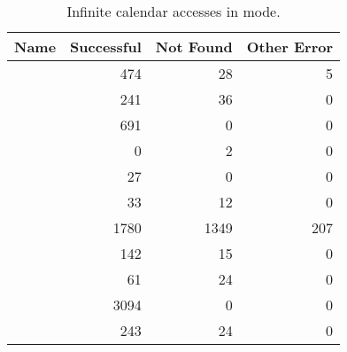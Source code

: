 \begin{centering}
  \begin{table}[htb]
    \centering
    {\scriptsize
      \begin{tabular}{|l|r|r|r|}
        \hline
        Name & Successful & Not Found & Other Error \\
        \hline
        \acunetix{} & 474 & 28 & 5 \\
        \appscan{} & 241 & 36 & 0 \\
        \burp{} & 691 & 0 & 0 \\
        \grendelscan{} & 0 & 2 & 0 \\
        \hailstorm{} & 27 & 0 & 0 \\
        \milescan{} & 33 & 12 & 0 \\
        \nstalker{} & 1780 & 1349 & 207 \\
        \ntospider{} & 142 & 15 & 0 \\
        \paros{} & 61 & 24 & 0 \\
        \waf{} & 3094 & 0 & 0 \\
        \webinspect{} & 243 & 24 & 0 \\
        \hline
    \end{tabular}}
    \caption{Infinite calendar accesses in \initial{} mode.}
  \end{table}
\end{centering}
